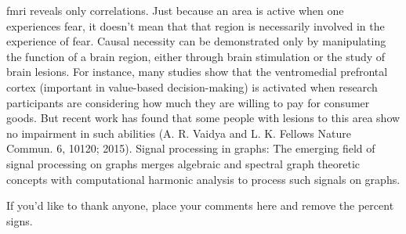 \documentclass[onecollarge,runningheads]{svjour2}
\begin{document}
fmri reveals only correlations. Just because an area is active when one experiences fear, it doesn't mean that that region is necessarily involved in the experience of fear. Causal necessity can be demonstrated only by manipulating the function of a brain region, either through brain stimulation or the study of brain lesions. For instance, many studies show that the ventromedial prefrontal cortex (important in value-based decision-making) is activated when research participants are considering how much they are willing to pay for consumer goods. But recent work has found that some people with lesions to this area show no impairment in such abilities (A. R. Vaidya and L. K. Fellows Nature Commun. 6, 10120; 2015).
Signal processing in graphs: The emerging field of signal processing on graphs merges algebraic and spectral graph theoretic concepts with computational harmonic analysis to process such signals on graphs. 
\citep{shuman2013emerging}

\begin{acknowledgements}
If you'd like to thank anyone, place your comments here
and remove the percent signs.
\end{acknowledgements}


\end{document}
